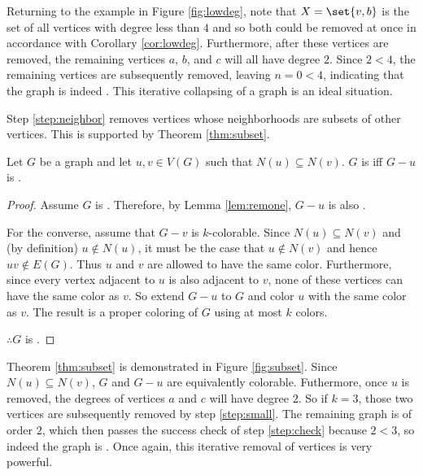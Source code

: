 Returning to the example in Figure \ref{fig:lowdeg}, note that \(X=\set{v,b}\) is the set of all vertices with
degree less than \(4\) and so both could be removed at once in accordance with Corollary \ref{cor:lowdeg}.
Furthermore, after these vertices are removed, the remaining vertices \(a\), \(b\), and \(c\) will all have degree
\(2\).  Since \(2<4\), the remaining vertices are subsequently removed, leaving \(n=0<4\), indicating that the
graph is indeed .  This iterative collapsing of a graph is an ideal situation.

Step \ref{step:neighbor} removes vertices whose neighborhoods are subsets of other vertices.  This is supported by
Theorem \ref{thm:subset}.

\begin{theorem}
  \label{thm:subset}
  Let \(G\) be a graph and let \(u,v\in V(G)\) such that \(N(u)\subseteq N(v)\).  \(G\) is  iff \(G-u\)
  is .
\end{theorem}

\begin{proof}
  Assume \(G\) is .  Therefore, by Lemma \ref{lem:remone}, \(G-u\) is also .

  For the converse, assume that \(G-v\) is \(k\)-colorable.  Since \(N(u)\subseteq N(v)\) and (by definition)
  \(u\notin N(u)\), it must be the case that \(u\notin N(v)\) and hence \(uv\notin E(G)\).  Thus \(u\) and \(v\)
  are allowed to have the same color.  Furthermore, since every vertex adjacent to \(u\) is also adjacent to \(v\),
  none of these vertices can have the same color as \(v\).  So extend \(G-u\) to \(G\) and color \(u\) with the
  same color as \(v\).  The result is a proper coloring of \(G\) using at most \(k\) colors.

  \(\therefore G\) is .
\end{proof}

Theorem \ref{thm:subset} is demonstrated in Figure \ref{fig:subset}.  Since \(N(u)\subseteq N(v)\), \(G\) and
\(G-u\) are equivalently colorable.  Futhermore, once \(u\) is removed, the degrees of vertices \(a\) and \(c\)
will have degree \(2\).  So if \(k=3\), those two vertices are subsequently removed by step \ref{step:small}.  The
remaining graph is of order \(2\), which then passes the success check of step \ref{step:check} because \(2<3\), so
indeed the graph is .  Once again, this iterative removal of vertices is very powerful.

